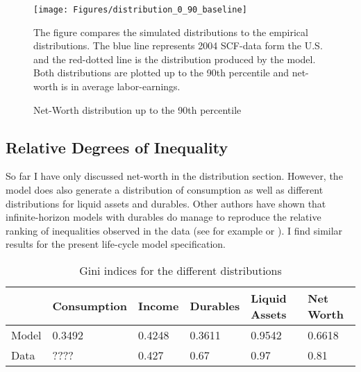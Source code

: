 \documentclass[a4paper,12pt,legno]{article}
\begin{document}
\begin{figure}[!htbp]
\caption{Net-Worth distribution up to the 90th percentile} 
\label{wealth_distr_base}	%
\centering
\texttt{[image: Figures/distribution\_0\_90\_baseline]}  %

\begin{minipage}{0.8\linewidth}
\footnotesize{The figure compares the simulated distributions to the empirical distributions. The blue line represents 2004 SCF-data form the U.S. and the red-dotted line is the distribution produced by the model. Both distributions are plotted up to the 90th percentile and net-worth is in average labor-earnings.}
\end{minipage}

\end{figure}


\subsection{Relative Degrees of Inequality}
So far I have only discussed net-worth in the distribution section. However, the model does also generate a distribution of consumption as well as different distributions for liquid assets and durables. Other authors have shown that infinite-horizon models with durables do manage to reproduce the relative ranking of inequalities observed in the data (see for example \cite{hintermaier2010} or \cite{diaz2010}). I find similar results for the present life-cycle model specification.


\begin{table}[!htbp]
\centering
\caption{Gini indices for the different distributions}
\label{Gini_Ranking}
\begin{tabular}{@{}llllll@{}}
\toprule
      & Consumption & Income & Durables & Liquid Assets & Net Worth \\ \midrule
Model & 0.3492      & 0.4248 & 0.3611   & 0.9542        & 0.6618    \\ \midrule
Data  & ????        & 0.427  & 0.67     & 0.97          & 0.81      \\ \bottomrule
\end{tabular}
\end{table}
\end{document}
